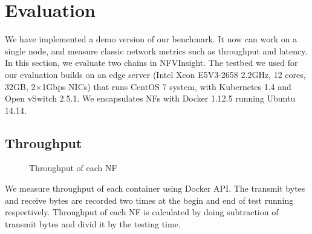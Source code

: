 \documentclass{sig-alternate-10pt}
\begin{document}
\section{Evaluation}
We have implemented a demo version of our benchmark. 
It now can work on a single node, 
and measure classic network metrics such as throughput and latency.
In this section, we evaluate two chains in NFVInsight. 
The testbed we used for our evaluation builds on an edge server (Intel Xeon E5V3-2658 2.2GHz, 12 cores, 32GB, 2$\times$1Gbps NICs) that runs CentOS 7 system, with Kubernetes 1.4 and Open vSwitch 2.5.1. We encapsulates NFs with Docker 1.12.5 running Ubuntu 14.14. 

\subsection{Throughput}

%

\begin{figure}[!t]
\centering
{}
\hfil
{}
\hfil
\caption{Throughput of each NF}
\label{throughput}
\end{figure}

We measure throughput of each container using Docker API. 
The transmit bytes and receive bytes are recorded two times 
at the begin and end of test running respectively. 
Throughput of each NF is calculated 
by doing subtraction of transmit bytes and divid it by the testing time.
\end{document}
